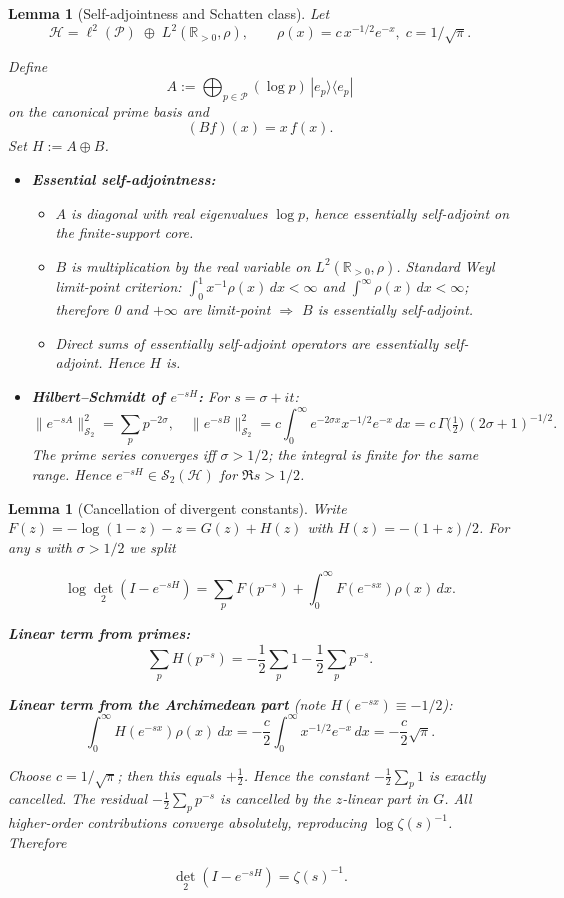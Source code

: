 \documentclass[11pt,a4paper]{article}
\newtheorem{lemma}[theorem]{Lemma}
\theoremstyle{definition}
\theoremstyle{remark}
\newcommand{\R}{\mathbb{R}}
\newcommand{\calP}{\mathcal{P}}
\newcommand{\calS}{\mathcal{S}}
\newcommand{\calH}{\mathcal{H}}
\begin{document}
\begin{lemma}[Self-adjointness and Schatten class]\label{lem:hybrid-self}
Let  
\[
\calH = \ell^{2}(\calP)\;\oplus\;L^{2}(\R_{>0},\rho),\qquad\rho(x)=c\,x^{-1/2}e^{-x},\; c=1/\sqrt\pi .
\]

Define  
\[
A:=\bigoplus_{p\in\calP}(\log p)\,|e_p\rangle\langle e_p|
\]
on the canonical prime basis and  
\[
(Bf)(x)=x\,f(x).
\]
Set $H:=A\oplus B$.

\begin{itemize}
\item \textbf{Essential self-adjointness:}  
  \begin{itemize}
  \item $A$ is diagonal with real eigenvalues $\log p$, hence essentially self-adjoint on the finite-support core.  
  \item $B$ is multiplication by the real variable on $L^{2}(\R_{>0},\rho)$.  Standard Weyl limit-point criterion:  
     $\int_{0}^{1}x^{-1}\rho(x)\,dx<\infty$ and $\int^{\infty}\rho(x)\,dx<\infty$; therefore 0 and $+\infty$ are limit-point $\Rightarrow$ $B$ is essentially self-adjoint.  
  \item Direct sums of essentially self-adjoint operators are essentially self-adjoint.  Hence $H$ is.
  \end{itemize}

\item \textbf{Hilbert--Schmidt of $e^{-sH}$:}  
  For $s=\sigma+it$:
  \[
  \|e^{-sA}\|_{\calS_{2}}^{2}=\sum_{p}p^{-2\sigma},\quad
  \|e^{-sB}\|_{\calS_{2}}^{2}=c\!\int_{0}^{\infty} e^{-2\sigma x}x^{-1/2}e^{-x}\,dx
  =c\,\Gamma\!\bigl(\tfrac12\bigr)\,(2\sigma+1)^{-1/2}.
  \]
  The prime series converges iff $\sigma>1/2$; the integral is finite for the same range.  
  Hence $e^{-sH}\in\calS_2(\calH)$ for $\Re s>1/2$.
\end{itemize}
\end{lemma}

\begin{lemma}[Cancellation of divergent constants]\label{lem:cancel}
Write $F(z)=-\log(1-z)-z=G(z)+H(z)$ with $H(z)=-(1+z)/2$.  
For any $s$ with $\sigma>1/2$ we split

\[
\log\det_2(I-e^{-sH})
=\sum_{p}F(p^{-s})+\int_{0}^{\infty}F(e^{-sx})\rho(x)\,dx.
\]

\textbf{Linear term from primes:}
\[
\sum_{p}H(p^{-s})=-\frac12\sum_{p}1-\frac12\sum_{p}p^{-s}.
\]

\textbf{Linear term from the Archimedean part} (note $H(e^{-sx})\equiv-1/2$):
\[
\int_{0}^{\infty}H(e^{-sx})\rho(x)\,dx=-\frac{c}{2}\int_{0}^{\infty}x^{-1/2}e^{-x}\,dx
=-\frac{c}{2}\sqrt{\pi}.
\]

Choose $c=1/\sqrt{\pi}$; then this equals $+\frac12$.  Hence the constant $-\frac12\sum_{p}1$ is exactly cancelled.  
The residual $-\frac12\sum_{p}p^{-s}$ is cancelled by the $z$-linear part in $G$.  All higher-order contributions converge absolutely, reproducing $\log\zeta(s)^{-1}$.  Therefore

\[
\det_2(I-e^{-sH})=\zeta(s)^{-1}.
\]
\end{lemma}
\end{document}
